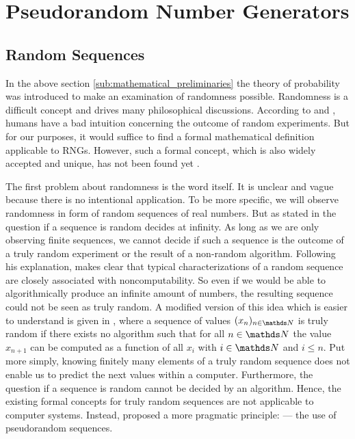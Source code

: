 \documentclass{stdlocal}
\begin{document}
\section{Pseudorandom Number Generators} %
\label{sec:pseudorandom_number_generators}
  \subsection{Random Sequences}
  In the above section \ref{sub:mathematical_preliminaries} the theory of probability was introduced to make an examination of randomness possible.
  Randomness is a difficult concept and drives many philosophical discussions.
  According to \textcite{volchan2002} and \textcite[\ppno~10-11]{kneusel2018}, humans have a bad intuition concerning the outcome of random experiments.
  But for our purposes, it would suffice to find a formal mathematical definition applicable to RNGs.
  However, such a formal concept, which is also widely accepted and unique, has not been found yet \autocite{volchan2002}.

  The first problem about randomness is the word itself.
  It is unclear and vague because there is no intentional application.
  To be more specific, we will observe randomness in form of random sequences of real numbers.
  But as stated in \textcite{volchan2002} the question if a sequence is random decides at infinity.
  As long as we are only observing finite sequences, we cannot decide if such a sequence is the outcome of a truly random experiment or the result of a non-random algorithm.
  Following his explanation, \citeauthor{volchan2002} makes clear that typical characterizations of a random sequence are closely associated with noncomputability.
  So even if we would be able to algorithmically produce an infinite amount of numbers, the resulting sequence could not be seen as truly random.
  A modified version of this idea which is easier to understand is given in \textcite{kneusel2018}, where a sequence of values $(x_n)_{n\in\setNatural}$ is truly random if there exists no algorithm such that for all $n\in\setNatural$ the value $x_{n+1}$ can be computed as a function of all $x_i$ with $i\in\setNatural$ and $i\leq n$.
  Put more simply, knowing finitely many elements of a truly random sequence does not enable us to predict the next values within a computer.
  Furthermore, the question if a sequence is random cannot be decided by an algorithm.
  Hence, the existing formal concepts for truly random sequences are not applicable to computer systems.
  Instead, \citeauthor{volchan2002} proposed a more pragmatic principle:  --- the use of pseudorandom sequences.
\end{document}
